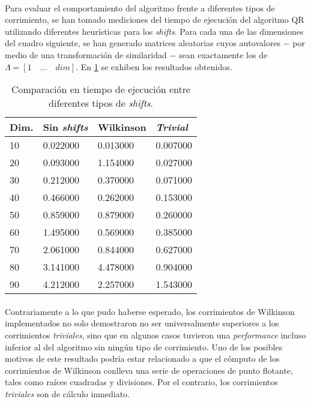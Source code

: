 \documentclass[12pt, twocolumn]{article}
\begin{document}
	\paragraph{} Para evaluar el comportamiento del algoritmo frente a diferentes tipos de corrimiento, se han tomado mediciones del tiempo de ejecución del algoritmo QR utilizando diferentes heurísticas para los \textit{shifts}. Para cada una de las dimensiones del cuadro siguiente, se han generado matrices aleatorias cuyos autovalores $-$ por medio de una transformación de similaridad $-$ sean exactamente los de $ \Lambda = \left[1\quad\dots\quad dim\right]$. En \ref{shcmp} se exhiben los resultados obtenidos.
	\begin{table}[h]
		\centering
		\label{shcmp}
		\begin{tabular}{@{}llll@{}}
			\toprule
			Dim. & Sin \textit{shifts} & Wilkinson & \textit{Trivial}  \\ \midrule
			10   & 0.022000           & 0.013000  & 0.007000 \\
			20   & 0.093000           & 1.154000  & 0.027000 \\
			30   & 0.212000           & 0.370000  & 0.071000 \\
			40   & 0.466000           & 0.262000  & 0.153000 \\
			50   & 0.859000           & 0.879000  & 0.260000 \\
			60   & 1.495000           & 0.569000  & 0.385000 \\
			70   & 2.061000           & 0.844000  & 0.627000 \\
			80   & 3.141000           & 4.478000  & 0.904000 \\
			90   & 4.212000           & 2.257000  & 1.543000 \\ \bottomrule
		\end{tabular}
		\caption{Comparación en tiempo de ejecución entre diferentes tipos de \textit{shifts}.}
	\end{table}
	
	\paragraph{} Contrariamente a lo que pudo haberse esperado, los corrimientos de Wilkinson implementados no solo demostraron no ser universalmente superiores a los corrimientos \textit{triviales}, sino que en algunos casos tuvieron una \textit{performance} incluso inferior al del algoritmo sin ningún tipo de corrimiento. Uno de los posibles motivos de este resultado podría estar relacionado a que el cómputo de los corrimientos de Wilkinson conlleva una serie de operaciones de punto flotante, tales como raíces cuadradas y divisiones. Por el contrario, los corrimientos \textit{triviales} son de cálculo inmediato.
	
\end{document}

